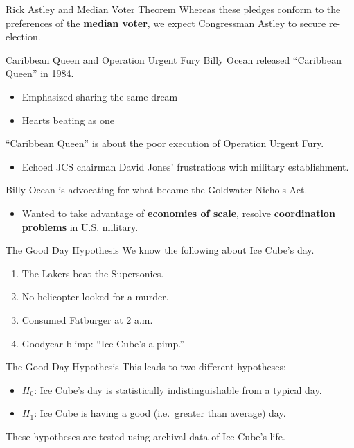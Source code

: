 \documentclass[
  ignorenonframetext,
]{beamer}
\providecommand{\tightlist}{%
  \setlength{\itemsep}{0pt}\setlength{\parskip}{0pt}}\usepackage{longtable,booktabs,array}
\begin{document}
\begin{frame}{Rick Astley and Median Voter Theorem}
\label{rick-astley-and-median-voter-theorem}
Whereas these pledges conform to the preferences of the \textbf{median
voter}, we expect Congressman Astley to secure re-election.
\end{frame}

\begin{frame}{Caribbean Queen and Operation Urgent Fury}
\label{caribbean-queen-and-operation-urgent-fury}
Billy Ocean released ``Caribbean Queen'' in 1984.

\begin{itemize}
\tightlist
\item
  Emphasized sharing the same dream
\item
  Hearts beating as one
\end{itemize}

``Caribbean Queen'' is about the poor execution of Operation Urgent
Fury.

\begin{itemize}
\tightlist
\item
  Echoed JCS chairman David Jones' frustrations with military
  establishment.
\end{itemize}

Billy Ocean is advocating for what became the Goldwater-Nichols Act.

\begin{itemize}
\tightlist
\item
  Wanted to take advantage of \textbf{economies of scale}, resolve
  \textbf{coordination problems} in U.S. military.
\end{itemize}
\end{frame}

\begin{frame}{The Good Day Hypothesis}
\label{the-good-day-hypothesis}
We know the following about Ice Cube's day.

\begin{enumerate}
\tightlist
\item
  The Lakers beat the Supersonics.
\item
  No helicopter looked for a murder.
\item
  Consumed Fatburger at 2 a.m.
\item
  Goodyear blimp: ``Ice Cube's a pimp.''
\end{enumerate}
\end{frame}

\begin{frame}{The Good Day Hypothesis}
\label{the-good-day-hypothesis-1}
This leads to two different hypotheses:

\begin{itemize}
\tightlist
\item
  \(H_0\): Ice Cube's day is statistically indistinguishable from a
  typical day.
\item
  \(H_1\): Ice Cube is having a good (i.e.~greater than average) day.
\end{itemize}

These hypotheses are tested using archival data of Ice Cube's life.
\end{frame}
\end{document}
